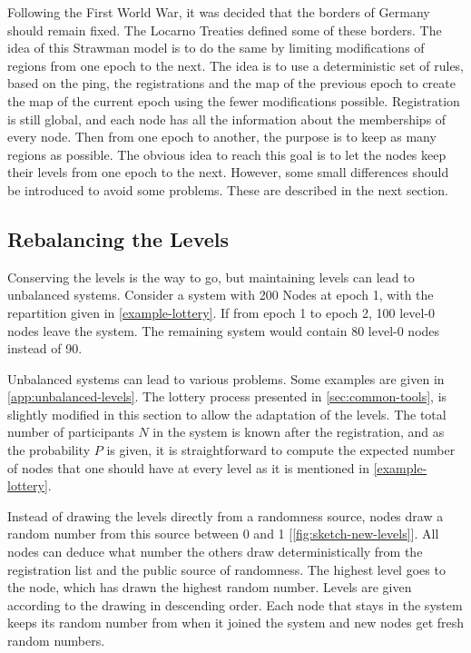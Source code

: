 \documentclass[a4paper,11pt,twoside,openright]{report}
\begin{document}
Following the First World War, it was decided that the borders of Germany
should remain fixed. The Locarno Treaties defined some of these borders. The
idea of this Strawman model is to do the same by limiting modifications of
regions from one epoch to the next. The idea is to use a deterministic set of
rules, based on the ping, the registrations and the map of the previous epoch
to create the map of the current epoch using the fewer modifications possible.
Registration is still global, and each node has all the information about
the memberships of every node. Then from one epoch to another, the purpose is to keep as many regions as possible. The obvious idea to reach this
goal is to let the nodes keep their levels from one epoch to the next. However,
some small differences should be introduced to avoid some problems.
These are described in the next section.

\subsection{Rebalancing the Levels} \label{rebalancing}
Conserving the levels is the way to go, but maintaining levels can lead to
unbalanced systems. Consider a system with 200 Nodes at epoch 1, with the
repartition given in \autoref{example-lottery}. If from epoch 1 to epoch 2,
100 level-0 nodes leave the system. The remaining system would contain 80
level-0 nodes instead of 90. 

Unbalanced systems can lead to various problems. Some examples are given in
\autoref{app:unbalanced-levels}. The lottery process presented in
\autoref{sec:common-tools}, is slightly modified in this section to allow the
adaptation of the levels. The total number of participants $N$ in the system is
known after the registration, and as the probability $P$ is given, it is
straightforward to compute the expected number of nodes that one should have at
every level as it is mentioned in \autoref{example-lottery}. 

Instead of drawing the levels directly from a randomness source, nodes 
draw a random number from this source between 0 and 1
[\autoref{fig:sketch-new-levels}]. All nodes can deduce what number the others
draw deterministically from the registration list and the public source of
randomness. The highest level goes to the node, which has drawn the highest
random number. Levels are given according to the drawing in descending
order. Each node that stays in the system keeps its random number from when
it joined the system and new nodes get fresh random numbers. 
\end{document}
